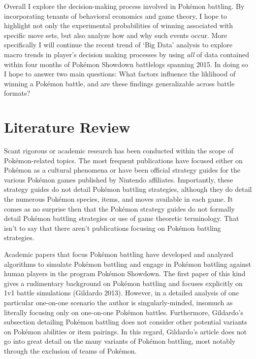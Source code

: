 \documentclass[12pt,twoside]{reedthesis}
\begin{document}
  Overall I explore the decision-making process involved in Pokémon
  battling. By incorporating tenants of behavioral economics and game
  theory, I hope to highlight not only the experimental probabilities of
  winning associated with specific move sets, but also analyze how and why
  such events occur. More specifically I will continue the recent trend of
  `Big Data' analysis to explore macro trends in player's decision making
  processes by using \emph{all} of data contained within four months of
  Pokémon Showdown battlelogs spanning 2015. In doing so I hope to answer
  two main questions: What factors influence the liklihood of winning a
  Pokémon battle, and are these findings generalizable across battle
  formats?
  
  \section{Literature Review}\label{literature-review}
  
  Scant rigorous or academic research has been conducted within the scope
  of Pokémon-related topics. The most frequent publications have focused
  either on Pokémon as a cultural phenomena or have been official strategy
  guides for the various Pokémon games published by Nintendo affiliates.
  Importantly, these strategy guides do not detail Pokémon battling
  strategies, although they do detail the numerous Pokémon species, items,
  and moves available in each game. It comes as no surprise then that the
  Pokémon strategy guides do not formally detail Pokémon battling
  strategies or use of game theoretic terminology. That isn't to say that
  there aren't publications focusing on Pokémon battling strategies.
  
  Academic papers that focus Pokémon battling have developed and analyzed
  algorithms to simulate Pokémon battling and engage in Pokémon battling
  against human players in the program Pokémon Showdown. The first paper
  of this kind gives a rudimentary background on Pokémon battling and
  focuses explicitly on 1v1 battle simulations (Gildardo 2013). However,
  in a detailed analysis of one particular one-on-one scenario the author
  is singularly-minded, insomuch as literally focusing only on one-on-one
  Pokémon battles. Furthermore, Gildardo's subsection detailing Pokémon
  battling does not consider other potential variants on Pokémon abilities
  or item pairings. In this regard, Gildardo's article does not go into
  great detail on the many variants of Pokémon battling, most notably
  through the exclusion of teams of Pokémon.
  
\end{document}
